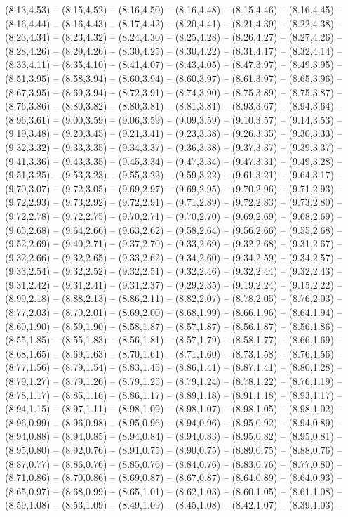 {(8.13,4.53) -- (8.15,4.52) -- (8.16,4.50) -- (8.16,4.48) -- (8.15,4.46) -- (8.16,4.45) -- (8.16,4.44) -- (8.16,4.43) -- (8.17,4.42) -- (8.20,4.41) -- (8.21,4.39) -- (8.22,4.38) -- (8.23,4.34) -- (8.23,4.32) -- (8.24,4.30) -- (8.25,4.28) -- (8.26,4.27) -- (8.27,4.26) -- (8.28,4.26) -- (8.29,4.26) -- (8.30,4.25) -- (8.30,4.22) -- (8.31,4.17) -- (8.32,4.14) -- (8.33,4.11) -- (8.35,4.10) -- (8.41,4.07) -- (8.43,4.05) -- (8.47,3.97) -- (8.49,3.95) -- (8.51,3.95) -- (8.58,3.94) -- (8.60,3.94) -- (8.60,3.97) -- (8.61,3.97) -- (8.65,3.96) -- (8.67,3.95) -- (8.69,3.94) -- (8.72,3.91) -- (8.74,3.90) -- (8.75,3.89) -- (8.75,3.87) -- (8.76,3.86) -- (8.80,3.82) -- (8.80,3.81) -- (8.81,3.81) -- (8.93,3.67) -- (8.94,3.64) -- (8.96,3.61) -- (9.00,3.59) -- (9.06,3.59) -- (9.09,3.59) -- (9.10,3.57) -- (9.14,3.53) -- (9.19,3.48) -- (9.20,3.45) -- (9.21,3.41) -- (9.23,3.38) -- (9.26,3.35) -- (9.30,3.33) -- (9.32,3.32) -- (9.33,3.35) -- (9.34,3.37) -- (9.36,3.38) -- (9.37,3.37) -- (9.39,3.37) -- (9.41,3.36) -- (9.43,3.35) -- (9.45,3.34) -- (9.47,3.34) -- (9.47,3.31) -- (9.49,3.28) -- (9.51,3.25) -- (9.53,3.23) -- (9.55,3.22) -- (9.59,3.22) -- (9.61,3.21) -- (9.64,3.17) -- (9.70,3.07) -- (9.72,3.05) -- (9.69,2.97) -- (9.69,2.95) -- (9.70,2.96) -- (9.71,2.93) -- (9.72,2.93) -- (9.73,2.92) -- (9.72,2.91) -- (9.71,2.89) -- (9.72,2.83) -- (9.73,2.80) -- (9.72,2.78) -- (9.72,2.75) -- (9.70,2.71) -- (9.70,2.70) -- (9.69,2.69) -- (9.68,2.69) -- (9.65,2.68) -- (9.64,2.66) -- (9.63,2.62) -- (9.58,2.64) -- (9.56,2.66) -- (9.55,2.68) -- (9.52,2.69) -- (9.40,2.71) -- (9.37,2.70) -- (9.33,2.69) -- (9.32,2.68) -- (9.31,2.67) -- (9.32,2.66) -- (9.32,2.65) -- (9.33,2.62) -- (9.34,2.60) -- (9.34,2.59) -- (9.34,2.57) -- (9.33,2.54) -- (9.32,2.52) -- (9.32,2.51) -- (9.32,2.46) -- (9.32,2.44) -- (9.32,2.43) -- (9.31,2.42) -- (9.31,2.41) -- (9.31,2.37) -- (9.29,2.35) -- (9.19,2.24) -- (9.15,2.22) -- (8.99,2.18) -- (8.88,2.13) -- (8.86,2.11) -- (8.82,2.07) -- (8.78,2.05) -- (8.76,2.03) -- (8.77,2.03) -- (8.70,2.01) -- (8.69,2.00) -- (8.68,1.99) -- (8.66,1.96) -- (8.64,1.94) -- (8.60,1.90) -- (8.59,1.90) -- (8.58,1.87) -- (8.57,1.87) -- (8.56,1.87) -- (8.56,1.86) -- (8.55,1.85) -- (8.55,1.83) -- (8.56,1.81) -- (8.57,1.79) -- (8.58,1.77) -- (8.66,1.69) -- (8.68,1.65) -- (8.69,1.63) -- (8.70,1.61) -- (8.71,1.60) -- (8.73,1.58) -- (8.76,1.56) -- (8.77,1.56) -- (8.79,1.54) -- (8.83,1.45) -- (8.86,1.41) -- (8.87,1.41) -- (8.80,1.28) -- (8.79,1.27) -- (8.79,1.26) -- (8.79,1.25) -- (8.79,1.24) -- (8.78,1.22) -- (8.76,1.19) -- (8.78,1.17) -- (8.85,1.16) -- (8.86,1.17) -- (8.89,1.18) -- (8.91,1.18) -- (8.93,1.17) -- (8.94,1.15) -- (8.97,1.11) -- (8.98,1.09) -- (8.98,1.07) -- (8.98,1.05) -- (8.98,1.02) -- (8.96,0.99) -- (8.96,0.98) -- (8.95,0.96) -- (8.94,0.96) -- (8.95,0.92) -- (8.94,0.89) -- (8.94,0.88) -- (8.94,0.85) -- (8.94,0.84) -- (8.94,0.83) -- (8.95,0.82) -- (8.95,0.81) -- (8.95,0.80) -- (8.92,0.76) -- (8.91,0.75) -- (8.90,0.75) -- (8.89,0.75) -- (8.88,0.76) -- (8.87,0.77) -- (8.86,0.76) -- (8.85,0.76) -- (8.84,0.76) -- (8.83,0.76) -- (8.77,0.80) -- (8.71,0.86) -- (8.70,0.86) -- (8.69,0.87) -- (8.67,0.87) -- (8.64,0.89) -- (8.64,0.93) -- (8.65,0.97) -- (8.68,0.99) -- (8.65,1.01) -- (8.62,1.03) -- (8.60,1.05) -- (8.61,1.08) -- (8.59,1.08) -- (8.53,1.09) -- (8.49,1.09) -- (8.45,1.08) -- (8.42,1.07) -- (8.39,1.03) -- }

